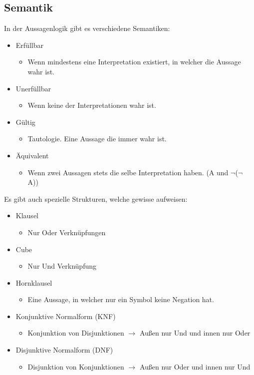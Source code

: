 \documentclass{article}
\begin{document}
		\subsection{Semantik}
		In der Aussagenlogik gibt es verschiedene Semantiken:
		\begin{itemize}
			\item{Erfüllbar}
			\begin{itemize}
				\item{Wenn mindestens eine Interpretation existiert, in welcher die Aussage wahr ist.}
			\end{itemize}
			\item{Unerfüllbar}
			\begin{itemize}
				\item{Wenn keine der Interpretationen wahr ist.}
			\end{itemize}
			\item{Gültig}
			\begin{itemize}
				\item{Tautologie. Eine Aussage die immer wahr ist.}
			\end{itemize}
			\item{Äquivalent}
			\begin{itemize}
				\item{Wenn zwei Aussagen stets die selbe Interpretation haben. (A und $\neg$($\neg$ A))}
			\end{itemize}
		\end{itemize}
		Es gibt auch spezielle Strukturen, welche gewisse aufweisen:
		\begin{itemize}
			\item{Klausel}
			\begin{itemize}
				\item{Nur Oder Verknüpfungen}
			\end{itemize}
			\item{Cube}
			\begin{itemize}
				\item{Nur Und Verknüpfung}
			\end{itemize}
			\item{Hornklausel}
			\begin{itemize}
				\item{Eine Aussage, in welcher nur ein Symbol keine Negation hat.}
			\end{itemize}
			\item{Konjunktive Normalform (KNF)}
			\begin{itemize}
				\item{Konjunktion von Disjunktionen $\to$ Außen nur Und und innen nur Oder}
			\end{itemize}
			\item{Disjunktive Normalform (DNF)}
			\begin{itemize}
				\item{Disjunktion von Konjunktionen $\to$ Außen nur Oder und innen nur Und}
			\end{itemize}
		\end{itemize}
\end{document}
